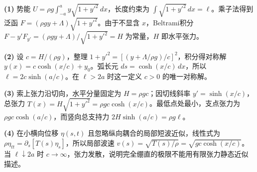 \par\noindent\textbf{(1)} 势能 \(U=\rho g\int_{-a}^{a} y\sqrt{1+y'^2}\,dx\)，长度约束为 \(\int\sqrt{1+y'^2}\,dx=\ell\)。乘子法得到泛函 \(F=(\rho gy+\Lambda)\sqrt{1+y'^2}\)。由于不显含 \(x\)，Beltrami积分 \(F-y'F_{y'}=(\rho gy+\Lambda)/\sqrt{1+y'^2}=H\) 为常量，\(H\) 即水平张力。
\par\noindent\textbf{(2)} 设 \(c=H/(\rho g)\)，整理 \(1+y'^2=[(y+\Lambda/\rho g)/c]^2\)，积分得对称解 \(y(x)=c\cosh(x/c)+y_0\)。弧长元 \(ds=\cosh(x/c)\,dx\)，所以 \(\ell=2c\sinh(a/c)\)。在 \(\ell>2a\) 时这一定义 \(c>0\) 的唯一对称解。
\par\noindent\textbf{(3)} 索上张力沿切向，水平分量固定为 \(H=\rho gc\)；因切线斜率 \(y'=\sinh(x/c)\)，总张力 \(T(x)=H\sqrt{1+y'^2}=\rho gc\cosh(x/c)\)。最低点处最小，支点张力为 \(\rho gc\cosh(a/c)\)，而竖向总支持力 \(2H\sinh(a/c)=\rho g\ell\)。
\par\noindent\textbf{(4)} 在小横向位移 \(\eta(s,t)\) 且忽略纵向耦合的局部短波近似，线性式为 \(\rho\eta_{tt}=\partial_s[T(s)\eta_s]\)，所以局部波速 \(v(s)=\sqrt{T(s)/\rho}=\sqrt{gc\cosh(x/c)}\)。当 \(\ell\downarrow2a\) 时 \(c\to\infty\)，张力发散，说明完全绷直的极限不能用有限张力静态近似描述。
